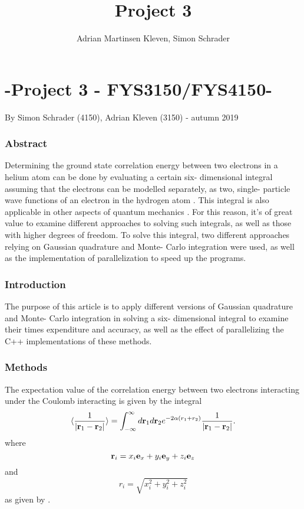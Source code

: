 \documentclass[10pt,a4paper]{article}
\author{Adrian Martinsen Kleven, Simon Schrader}
\title{Project 3}
\begin{document}
\part*{-Project 3 - FYS3150/FYS4150-
}
{\large By Simon Schrader (4150), Adrian Kleven (3150) - autumn 2019
}
\tableofcontents

\listoffigures
\listoftables

 
\clearpage
 
\section{Abstract}
Determining the ground state correlation energy between two electrons in a helium atom can be done by evaluating a certain six- dimensional integral assuming that the electrons can be modelled separately, as two, single- particle wave functions of an electron in the hydrogen atom \cite{Problem_set_3}. This integral is also applicable in other aspects of quantum mechanics \cite{Problem_set_3}. For this reason, it's of great value to examine different approaches to solving such integrals, as well as those with higher degrees of freedom. To solve this integral, two different approaches relying on Gaussian quadrature and Monte- Carlo integration were used, as well as the implementation of parallelization to speed up the programs.
\section{Introduction} 
The purpose of this article is to apply different versions of Gaussian quadrature and Monte- Carlo integration in solving a six- dimensional integral to examine their times expenditure and accuracy, as well as the effect of parallelizing the C++ implementations of these methods.

\section{Methods}
The expectation value of the correlation energy between two electrons interacting under the Coulomb interacting is given by the integral
\begin{equation}\label{eq:correlationenergy}
   \langle \frac{1}{|{\bf r}_1-{\bf r}_2|} \rangle =
   \int_{-\infty}^{\infty} d{\bf r}_1d{\bf r}_2  e^{-2\alpha (r_1+r_2)}\frac{1}{|{\bf r}_1-{\bf r}_2|}.
\end{equation}
where 
$$
   {\bf r}_i =  x_i {\bf e}_x + y_i {\bf e}_y +z_i {\bf e}_z
$$
and
$$
r_i = \sqrt{x_i^2+y_i^2+z_i^2}
$$
as given by \cite{Problem_set_3}.
\end{document}
